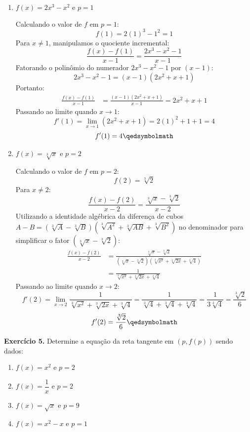 \begin{enumerate}[label=\alph*)]
    \item $f(x) = 2x^3 - x^2$ e $p = 1$

    Calculando o valor de $f$ em $p = 1$:
    \[
    f(1) = 2(1)^3 - 1^2 = 1
    \]
    Para $x \neq 1$, manipulamos o quociente incremental:
    \[
    \frac{f(x) - f(1)}{x - 1} = \frac{2x^3 - x^2 - 1}{x - 1}
    \]
    Fatorando o polinômio do numerador $2x^3 - x^2 - 1$ por $(x - 1)$:
    \[
    2x^3 - x^2 - 1 = (x - 1)(2x^2 + x + 1)
    \]
    Portanto:
    \begin{align*}
        \frac{f(x) - f(1)}{x - 1} &= \frac{(x - 1)(2x^2 + x + 1)}{x - 1} = 2x^2 + x + 1
    \end{align*}
    Passando ao limite quando $x \to 1$:
    \[
    f'(1) = \lim_{x \to 1} (2x^2 + x + 1) = 2(1)^2 + 1 + 1 = 4
    \]
    \[
    f'(1) = 4 \qedsymbolmath
    \]

    \item $f(x) = \sqrt[3]{x}$ e $p = 2$

    Calculando o valor de $f$ em $p = 2$:
    \[
    f(2) = \sqrt[3]{2}
    \]
    Para $x \neq 2$:
    \[
    \frac{f(x) - f(2)}{x - 2} = \frac{\sqrt[3]{x} - \sqrt[3]{2}}{x - 2}
    \]
    Utilizando a identidade algébrica da diferença de cubos $A - B = (\sqrt[3]{A} - \sqrt[3]{B})\left(\sqrt[3]{A^2} + \sqrt[3]{AB} + \sqrt[3]{B^2}\right)$ no denominador para simplificar o fator $(\sqrt[3]{x} - \sqrt[3]{2})$:
    \begin{align*}
        \frac{f(x) - f(2)}{x - 2} &= \frac{\sqrt[3]{x} - \sqrt[3]{2}}{(\sqrt[3]{x} - \sqrt[3]{2})\left(\sqrt[3]{x^2} + \sqrt[3]{2x} + \sqrt[3]{4}\right)} \\[0.25cm]
        &= \frac{1}{\sqrt[3]{x^2} + \sqrt[3]{2x} + \sqrt[3]{4}}
    \end{align*}
    Passando ao limite quando $x \to 2$:
    \[
    f'(2) = \lim_{x \to 2} \frac{1}{\sqrt[3]{x^2} + \sqrt[3]{2x} + \sqrt[3]{4}} = \frac{1}{\sqrt[3]{4} + \sqrt[3]{4} + \sqrt[3]{4}} = \frac{1}{3\sqrt[3]{4}} = \frac{\sqrt[3]{2}}{6}
    \]
    \[
    f'(2) = \frac{\sqrt[3]{2}}{6} \qedsymbolmath
    \]
\end{enumerate}

\vspace{0.6cm}
\noindent\textbf{Exercício 5.} Determine a equação da reta tangente em $(p, f(p))$ sendo dados:
\begin{enumerate}[label=\alph*)]
    \item $f(x) = x^2$ e $p = 2$
    \item $f(x) = \dfrac{1}{x}$ e $p = 2$
    \item $f(x) = \sqrt{x}$ e $p = 9$
    \item $f(x) = x^2 - x$ e $p = 1$
\end{enumerate}
\setcounter{equation}{0}

